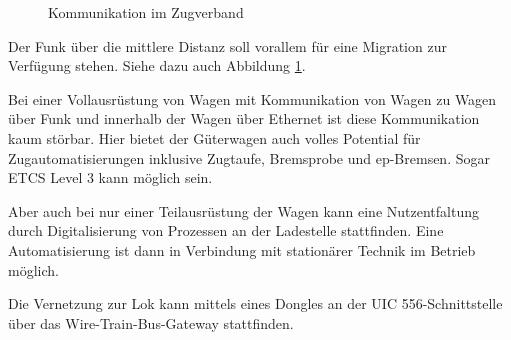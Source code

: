 \begin{figure}[hbt]
    \centering
    
    \caption{Kommunikation im Zugverband\cite{autonBetrieb}}
    \label{fig:Zugkomm}
\end{figure}
Der Funk über die mittlere Distanz soll vorallem für eine Migration zur Verfügung stehen. Siehe dazu auch Abbildung \ref{fig:Zugkomm}.\par
Bei einer Vollausrüstung von Wagen mit Kommunikation von Wagen zu Wagen über Funk und innerhalb der Wagen über Ethernet ist diese Kommunikation kaum störbar. Hier bietet der Güterwagen auch volles Potential für Zugautomatisierungen inklusive Zugtaufe, Bremsprobe und ep-Bremsen. Sogar ETCS Level 3 kann möglich sein.\par
Aber auch bei nur einer Teilausrüstung der Wagen kann eine Nutzentfaltung durch Digitalisierung von Prozessen an der Ladestelle stattfinden. Eine Automatisierung ist dann in Verbindung mit stationärer Technik im Betrieb möglich.\par
Die Vernetzung zur Lok kann mittels eines Dongles an der UIC 556-Schnittstelle über das Wire-Train-Bus-Gateway stattfinden.\par

